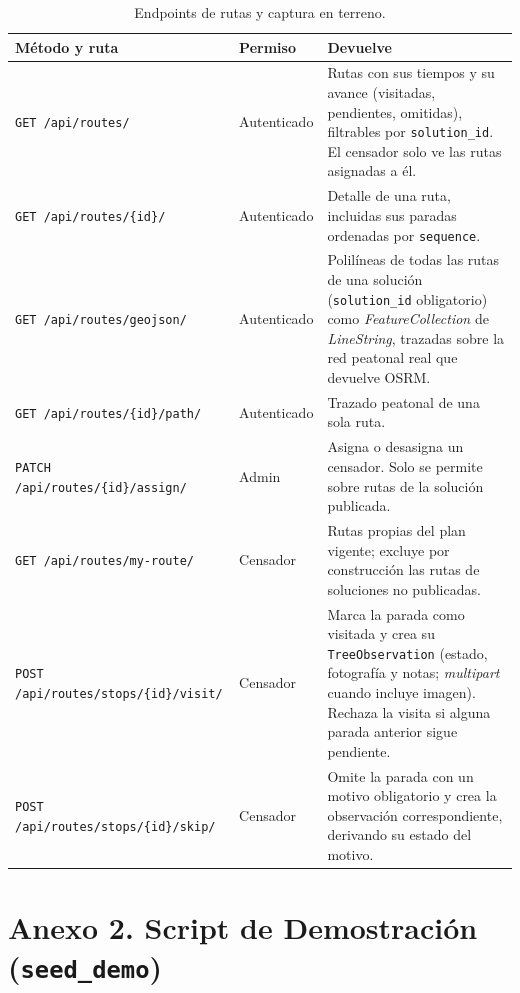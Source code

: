 \begin{table}[H]
  \centering
  \caption{Endpoints de rutas y captura en terreno.}
  \label{tab:anexo_api_routes}
  \small
  \begin{tabularx}{\textwidth}{@{}p{5.5cm} p{1.9cm} X@{}}
    \toprule
    Método y ruta & Permiso & Devuelve \\
    \midrule
    \texttt{GET \slash api\slash routes\slash }                    & Autenticado & Rutas con sus tiempos y su avance (visitadas, pendientes, omitidas), filtrables por \texttt{solution\_id}. El censador solo ve las rutas asignadas a él. \\
    \texttt{GET \slash api\slash routes\slash \{id\}\slash }             & Autenticado & Detalle de una ruta, incluidas sus paradas ordenadas por \texttt{sequence}. \\
    \texttt{GET \slash api\slash routes\slash geojson\slash }            & Autenticado & Polilíneas de todas las rutas de una solución (\texttt{solution\_id} obligatorio) como \textit{FeatureCollection} de \textit{LineString}, trazadas sobre la red peatonal real que devuelve OSRM. \\
    \texttt{GET \slash api\slash routes\slash \{id\}\slash path\slash }        & Autenticado & Trazado peatonal de una sola ruta. \\
    \texttt{PATCH \slash api\slash routes\slash \{id\}\slash assign\slash }    & Admin       & Asigna o desasigna un censador. Solo se permite sobre rutas de la solución publicada. \\
    \texttt{GET \slash api\slash routes\slash my-route\slash }           & Censador    & Rutas propias del plan vigente; excluye por construcción las rutas de soluciones no publicadas. \\
    \texttt{POST \slash api\slash routes\slash stops\slash \{id\}\slash visit\slash } & Censador   & Marca la parada como visitada y crea su \texttt{TreeObservation} (estado, fotografía y notas; \textit{multipart} cuando incluye imagen). Rechaza la visita si alguna parada anterior sigue pendiente. \\
    \texttt{POST \slash api\slash routes\slash stops\slash \{id\}\slash skip\slash }  & Censador   & Omite la parada con un motivo obligatorio y crea la observación correspondiente, derivando su estado del motivo. \\
    \bottomrule
  \end{tabularx}
\end{table}

\section*{Anexo 2. Script de Demostración (\texttt{seed\_demo})}

